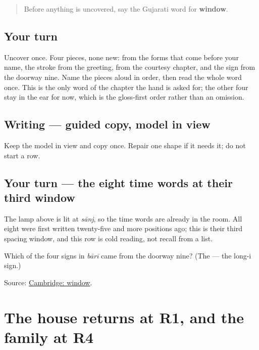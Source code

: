 \label{lesson:GU-C28-baari}



\begin{quote}
Before anything is uncovered, say the Gujarati word for \textbf{window}.
\end{quote}

\subsection*{Your turn}
Uncover \textbf{} once. Four pieces, none new: \textbf{} from the forms that come before your name, the \textbf{} stroke from the greeting, \textbf{} from the courtesy chapter, and the \textbf{} sign from the doorway nine. Name the pieces aloud in order, then read the whole word once. This is the only word of the chapter the hand is asked for; the other four stay in the ear for now, which is the gloss-first order rather than an omission.

\subsection*{Writing — guided copy, model in view}
Keep the model in view and copy \textbf{} once. Repair one shape if it needs it; do not start a row.

\subsection*{Your turn — the eight time words at their third window}
The lamp above is lit at \emph{sānj}, so the time words are already in the room. All eight were first written twenty-five and more positions ago; this is their third spacing window, and this row is cold reading, not recall from a list.

\begin{tcolorbox}[breakable,colback=teal!4,colframe=teal!35!black,title={Before you move on}]
Which of the four signs in \emph{bārī} came from the doorway nine? (The \textbf{} — the long-i sign.)

Source: \href{https://dictionary.cambridge.org/dictionary/english-gujarati/window}{Cambridge: window}.
\end{tcolorbox}
\section[Practice]{The house returns at R1, and the family at R4}

